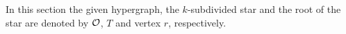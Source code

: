 \documentclass[MS]             %
              {iitmdiss_as}    %
\begin{document}
In this section the given hypergraph, the $k$-subdivided star and the
root of the star are denoted by ${\cal O}$, $T$ and vertex $r$,
respectively.

% 
\end{document}
